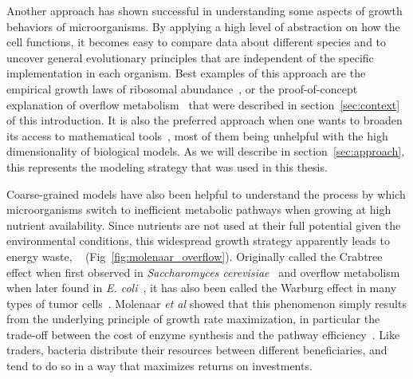 Another approach has shown successful in understanding some aspects of growth behaviors of microorganisms.
By applying a high level of abstraction on how the cell functions, it becomes easy to compare data about different species and to uncover general evolutionary principles that are independent of the specific implementation in each organism.
Best examples of this approach are the empirical growth laws of ribosomal abundance~\cite{scott_bacterial_2011,scott_interdependence_2010,scott_emergence_2014}, or the proof-of-concept explanation of overflow metabolism~\cite{molenaar_shifts_2009} that were described in section~\ref{sec:context} of this introduction.
It is also the preferred approach when one wants to broaden its access to mathematical tools~\cite{vandenberg_optimal_1998}, most of them being unhelpful with the high dimensionality of biological models.
As we will describe in section~\ref{sec:approach}, this represents the modeling strategy that was used in this thesis.

Coarse-grained models have also been helpful to understand the process by which microorganisms switch to inefficient metabolic pathways when growing at high nutrient availability.
Since nutrients are not used at their full potential given the environmental conditions, this widespread growth strategy apparently leads to energy waste, ~\cite{molenaar_shifts_2009} (Fig~\ref{fig:molenaar_overflow}).
Originally called the Crabtree effect when first observed in \textit{Saccharomyces cerevisiae}~\cite{dijken_kinetics_1993} and overflow metabolism when later found in \textit{E. coli}~\cite{vemuri_overflow_2006}, it has also been called the Warburg effect in many types of tumor cells~\cite{mckeehan_glycolysis_1982,hsu_cancer_2008}.
Molenaar \textit{et al} showed that this phenomenon simply results from the underlying principle of growth rate maximization, in particular the trade-off between the cost of enzyme synthesis and the pathway efficiency~\cite{molenaar_shifts_2009}.
Like traders, bacteria distribute their resources between different beneficiaries, and tend to do so in a way that maximizes returns on investments.

